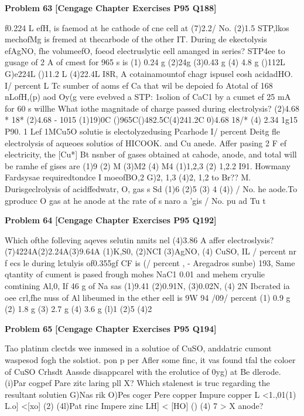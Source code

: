 \begin{problembox}
\textbf{Problem 63} \hfill \textbf{[Cengage Chapter Exercises P95 Q188]}
\label{q:ext-cng-th-63}

f0.224 L efH,  is faemod at he cathode of cne cell at
(7)2.2/ No. 
(2)1.5 
STP,lkos mechofMg is fremed at thecarbode of the other
IT. During de ekectolysis efAgNO, fhe volumeefO, foeod
electruslytic eell amanged in series?
 STP4ee to gusage of 2 A of cmest for 965 s is
(1) 0.24 g
(2)24g
(3)0.43 g
(4) 4.8 g
()112L G)e224L ()11.2 L
(4)22.4L
I8R, A cotainamountof chagr ispusel eosh acidadHO.
I/ percent L Tc sumber of aoms ef Ca that wil be depoied fo
Atotal of 168 nLofH,(p) aod Oy(g vere evebved a STP:
1solion of CaC1 by a cumet ef 25 mA for 60 s willhe
What iothe magnitade of charge passed during electrolysis?
(2)4.68 * 18*
(2)4.68 - 1015
(1)19)0C ()965C()482.5C(4)241.2C
0)4.68   18/*
(4) 2.34   1g15
P90. 1 Lef 1MCu5O solutie is electolyzedusing Pcarhode
I/ percent  Deitg fle electrolysis of aqueoes solutios of HICOOK.
and Cu anede. Affer pasing 2 F ef electricity, the [Cu*]
Bt nsnber of gases obtained at cahode, anode, and total
will be
ramhe ef gises are
(1)9
(2) M
(3)M2
(4) M4
(1)1,2,3
(2) 1,2.2
I91. Howmany Fardsysae requiredtondce I moeofBO,2
G)2, 1,3
(4)2, 1,2
to Br??
M. Durisgeclrolysis of acidffedwatr, O, gas s Sd
(1)6
(2)5
(3) 4
(4))
/ No.  he aode.To gproducc O gas at he anode at thc rate of
s naro a 'gis / No.  pu ad Tu t
\end{problembox}

\begin{problembox}
\textbf{Problem 64} \hfill \textbf{[Cengage Chapter Exercises P95 Q192]}
\label{q:ext-cng-th-64}

Which ofthe folleving aqeves selutin nmits nel
(4)3.86 A
affer electroslysis?
(7)4224A(2)2.24A(3)9.64A
(1)K,S0,
(2)NCI
(3)AgNO,
(4) CuSO,
IL / percent nr f ecs le during lctulyis of0.355gf
CF is (/ percent , - Aregadros sunbe)
193, Same qtantity of cument is pased frough mohes NaC1
0.01
and mehem cryulie comtining Al,0, If 46 g of Na sas
(1)9.41
(2)0.91N,
(3)0.02N,
(4) 
2N
Ibcrated ia oee crl,fhe nuss of Al libeumed in the ether
eell is
9W 94 /09/ percent 
(1) 0.9 g
(2) 1.8 g
(3) 2.7 g
(4) 3.6 g
(l)1
(2)5
(4)2
\end{problembox}

\begin{problembox}
\textbf{Problem 65} \hfill \textbf{[Cengage Chapter Exercises P95 Q194]}
\label{q:ext-cng-th-65}

Tao platinm clectds wee inmesed in a solutioe of
CuSO, anddatric cumont waspesod fogh the solstiot.
 pon p per 
Afler some finc, it vas found tfal the coloer of CuSO
Crhsdt
Aassde
disappcarel with the erolutice of 0yg) at Be dlerode.
(i)Par cogpef
Pare zitc
laring pll  X?
Which stalenest is truc regarding the resultant solutien
G)Nas rik
O)Pes coger
Pere copper
Impure copper
L  <1.,01(1)
L.o] <[xo] (2)
(4l)Pat rinc
Impere zinc
LH] < [HO] ()
(4) 7 > X
anode?
\end{problembox}

